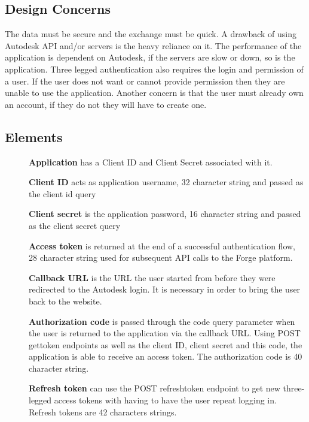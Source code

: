 \documentclass[letterpaper, 10pt, draftclsnofoot, compsoc, onecolumn]{IEEEtran}
\begin{document}
\subsection{Design Concerns}
	The data must be secure and the exchange must be quick. A drawback of using Autodesk API and/or servers is the heavy reliance on it. The performance of the application is dependent on Autodesk, if the servers are slow or down, so is the application. Three legged authentication also requires the login and permission of a user. If the user does not want or cannot provide permission then they are unable to use the application. Another concern is that the user must already own an account, if they do not they will have to create one. 
\subsection{Elements}
\begin{description}
	\item[]\textbf{Application} has a Client ID and Client Secret associated with it.
	\item[]\textbf{Client ID} acts as application username, 32 character string and passed as the client id query
	\item[]\textbf{Client secret} is the application password, 16 character string and passed as the client secret query
	\item[]\textbf{Access token} is returned at the end of a successful authentication flow, 28 character string used for subsequent API calls to the Forge platform. 
	\item[]\textbf{Callback URL} is the URL the user started from before they were redirected to the Autodesk login. It is necessary in order to bring the user back to the website.
	\item[]\textbf{Authorization code} is passed through the code query parameter when the user is returned to the application via the callback URL. Using POST gettoken endpoints as well as the client ID, client secret and this code, the application is able to receive an access token. The authorization code is 40 character string.
	\item[]\textbf{Refresh token} can use the POST refreshtoken endpoint to get new three-legged access tokens with having to have the user repeat logging in. Refresh tokens are 42 characters strings.

\end{description}
\end{document}
